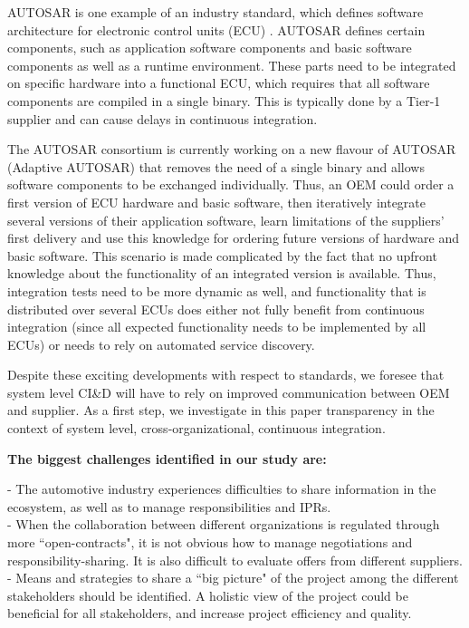 AUTOSAR is one example of an industry standard, which defines software architecture for electronic control units (ECU) \cite{fennel2006achievements}. %
AUTOSAR defines certain components, such as application software components and basic software components as well as a runtime environment.
These parts need to be integrated on specific hardware into a functional ECU, which requires that all software components are compiled in a single binary.
This is typically done by a Tier-1 supplier and can cause delays in continuous integration.



{The AUTOSAR consortium is currently working on a new flavour of AUTOSAR (Adaptive AUTOSAR) that removes the need of a single binary and allows software components to be exchanged individually.
Thus, an OEM could order a first version of ECU hardware and basic software, then iteratively integrate  several versions of their application software, learn limitations of the suppliers' first delivery and use this knowledge for ordering future versions of hardware and basic software.
This scenario is made complicated by the fact that no upfront knowledge about the functionality of an integrated version is available.
Thus, integration tests need to be more dynamic as well, and functionality that is distributed over several ECUs does either not fully benefit from continuous integration (since all expected functionality needs to be implemented by all ECUs) or needs to rely on automated service discovery.}
 
{Despite these exciting developments with respect to standards, we foresee that system level CI\&D will have to rely on improved communication between OEM and supplier.
As a first step, we investigate in this paper transparency in the context of system level, cross-organizational, continuous integration.}

\noindent \textbf{The biggest challenges identified in our study are: }

 - The automotive industry experiences difficulties to share information in the ecosystem, as well as to manage responsibilities and IPRs. \\
 - When the collaboration between different organizations is regulated through more ``open-contracts", it is not obvious  how to manage negotiations and responsibility-sharing. It is also difficult to evaluate offers from different suppliers.\\ %
 -  Means and strategies to share a ``big picture" of the project among the different stakeholders should be identified. A holistic view of the project could be beneficial for all stakeholders, and increase project efficiency and quality. 




